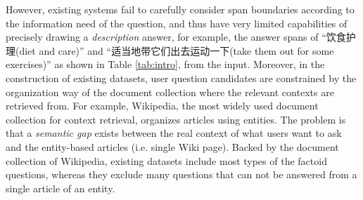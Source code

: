 \documentclass[a4paper]{cas-sc}
\newcommand{\1}[1]{\mathds{1}\left[#1\right]}
\newcommand{\tableref}[1]{Table \ref{#1}}
\begin{document}
However, existing systems fail to carefully consider span boundaries according to the information need of the question, 
and thus have very limited capabilities of 
precisely drawing a \emph{description} answer, for example, 
the answer spans of ``饮食护理(diet and care)'' and  ``适当地带它们出去运动一下(take them out for some exercises)''
as shown in \tableref{tab:intro}, from the input.
Moreover,  in the construction of existing datasets, 
user question candidates are constrained 
by the organization way of the document collection 
where the relevant contexts are retrieved from. 
For example, Wikipedia, the most widely used document collection 
for context retrieval, organizes articles using entities.
The problem is that a \emph{semantic gap} exists between the real context of what users want to ask and the entity-based articles (i.e. single Wiki page). 
Backed by the document collection of Wikipedia, 
existing datasets include most types of the factoid questions,
whereas they exclude many questions that can not be answered from a single 
article of an entity.
\end{document}
